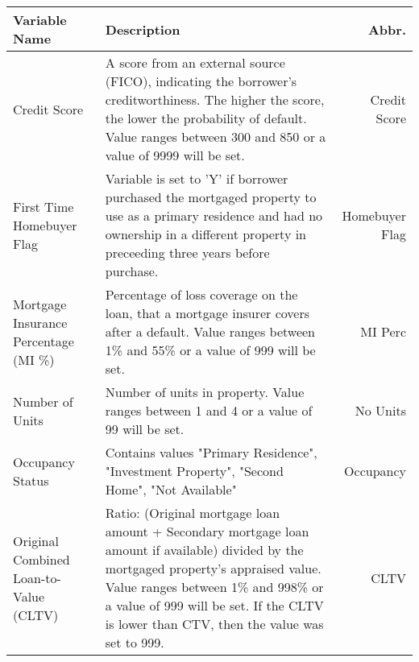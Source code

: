 \newpage

\begin{longtable}{ Lp{8cm}R }\toprule
\textbf{Variable Name}                             & \textbf{Description}                                                                                                                                                                                                                                                                          & \textbf{Abbr.}       \\\midrule
Credit Score                              & A score from an external source (FICO), indicating the borrower's creditworthiness. The higher the score, the lower the probability of default. Value ranges between 300 and 850 or a value of 9999 will be set.                                                                     & Credit Score       \\\hline
First Time Homebuyer Flag                 & Variable is set to 'Y' if borrower purchased the mortgaged property to use as a primary residence and had no ownership in a different property in preceeding three years before purchase.                                                                                            & Homebuyer Flag     \\\hline
Mortgage Insurance Percentage (MI \%)     & Percentage of loss coverage on the loan, that a mortgage insurer covers after a default. Value ranges between 1\% and 55\% or a value of 999 will be set.                                                                                                                            & MI Perc            \\\hline
Number of Units                           & Number of units in property. Value ranges between 1 and 4 or a value of 99 will be set.                                                                                                                                                                                              & No Units           \\\hline
Occupancy Status                          & Contains values "Primary Residence", "Investment Property", "Second Home", "Not Available"                                                                                                                                                                                           & Occupancy          \\\hline
Original Combined Loan-to-Value (CLTV)    & Ratio: (Original mortgage loan amount + Secondary mortgage loan amount if available) divided by the mortgaged property’s appraised value. Value ranges between 1\% and 998\% or a value of 999 will be set. If the CLTV is lower than CTV, then the value was set to 999.            & CLTV               \\\hline

\end{longtable}
